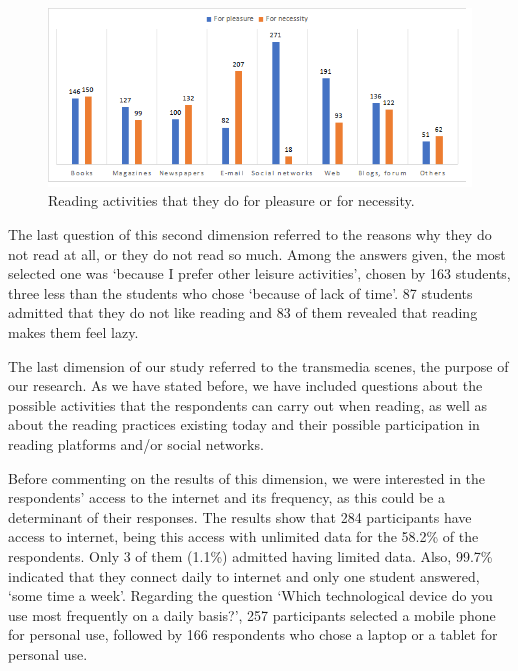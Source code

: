 \documentclass[english]{textolivre}
\begin{document}
\begin{figure}[htbp]
\centering
\begin{minipage}{.85\textwidth}
 \includegraphics[width=\textwidth]{Imagem3.png}
 \caption{Reading activities that they do for pleasure or for necessity.}
 \label{fig03}
\end{minipage}
\end{figure}

The last question of this second dimension referred to the reasons why they do not read at all, or they do not read so much. Among the answers given, the most selected one was ‘because I prefer other leisure activities’, chosen by 163 students, three less than the students who chose ‘because of lack of time’. 87 students admitted that they do not like reading and 83 of them revealed that reading makes them feel lazy.

The last dimension of our study referred to the transmedia scenes, the purpose of our research. As we have stated before, we have included questions about the possible activities that the respondents can carry out when reading, as well as about the reading practices existing today and their possible participation in reading platforms and/or social networks. 

Before commenting on the results of this dimension, we were interested in the respondents’ access to the internet and its frequency, as this could be a determinant of their responses. The results show that 284 participants have access to internet, being this access with unlimited data for the 58.2\% of the respondents. Only 3 of them (1.1\%) admitted having limited data. Also, 99.7\% indicated that they connect daily to internet and only one student answered, ‘some time a week’. Regarding the question ‘Which technological device do you use most frequently on a daily basis?’, 257 participants selected a mobile phone for personal use, followed by 166 respondents who chose a laptop or a tablet for personal use.
\end{document}
